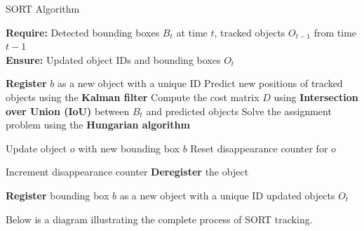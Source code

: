 \documentclass{CSSRforAfrica}
\begin{document}
\begin{algorithm}
	\caption{SORT Algorithm}
	\textbf{Require:} Detected bounding boxes $B_t$ at time $t$, tracked objects $O_{t-1}$ from time $t-1$ \\
	\textbf{Ensure:} Updated object IDs and bounding boxes $O_t$
	\begin{algorithmic}[1]
		\State \textbf{Register} $b$ as a new object with a unique ID
		\EndFor
		\Else
		\State Predict new positions of tracked objects using the \textbf{Kalman filter}
		\State Compute the cost matrix $D$ using \textbf{Intersection over Union (IoU)} between $B_t$ and predicted objects
		\State Solve the assignment problem using the \textbf{Hungarian algorithm}
		
		\State Update object $o$ with new bounding box $b$
		\State Reset disappearance counter for $o$
		\EndFor
		
		\State Increment disappearance counter
		\State \textbf{Deregister} the object
		\EndIf
		\EndFor
		
		\State \textbf{Register} bounding box $b$ as a new object with a unique ID
		\EndFor
		\EndIf
		\State \Return updated objects $O_t$
	\end{algorithmic}
\end{algorithm}
\vspace{-0.3cm}
Below is a diagram illustrating the complete process of SORT tracking.
\end{document}

